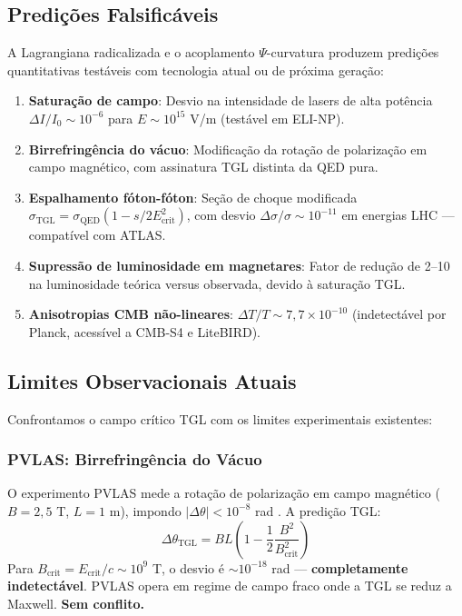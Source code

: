 \documentclass[12pt,a4paper,twoside]{article}
\newcommand{\Psifield}{\Psi}
\newcommand{\Ecrit}{E_{\text{crit}}}
\begin{document}
\subsection{Predi\c{c}\~oes Falsific\'aveis}

A Lagrangiana radicalizada e o acoplamento $\Psifield$-curvatura produzem predi\c{c}\~oes quantitativas test\'aveis com tecnologia atual ou de pr\'oxima gera\c{c}\~ao:

\begin{enumerate}[nosep]
\item \textbf{Satura\c{c}\~ao de campo}: Desvio na intensidade de lasers de alta pot\^encia $\Delta I/I_0 \sim 10^{-6}$ para $E \sim 10^{15}$ V/m (test\'avel em ELI-NP).

\item \textbf{Birrefring\^encia do v\'acuo}: Modifica\c{c}\~ao da rota\c{c}\~ao de polariza\c{c}\~ao em campo magn\'etico, com assinatura TGL distinta da QED pura.

\item \textbf{Espalhamento f\'oton-f\'oton}: Se\c{c}\~ao de choque modificada $\sigma_{\text{TGL}} = \sigma_{\text{QED}}\!\left(1 - s/2\Ecrit^2\right)$, com desvio $\Delta\sigma/\sigma \sim 10^{-11}$ em energias LHC --- compat\'ivel com ATLAS.

\item \textbf{Supress\~ao de luminosidade em magnetares}: Fator de redu\c{c}\~ao de 2--10 na luminosidade te\'orica versus observada, devido \`a satura\c{c}\~ao TGL.

\item \textbf{Anisotropias CMB n\~ao-lineares}: $\Delta T/T \sim 7{,}7 \times 10^{-10}$ (indetect\'avel por Planck, acess\'ivel a CMB-S4 e LiteBIRD).
\end{enumerate}



\subsection{Limites Observacionais Atuais}

Confrontamos o campo cr\'itico TGL com os limites experimentais existentes:

\subsubsection{PVLAS: Birrefring\^encia do V\'acuo}

O experimento PVLAS mede a rota\c{c}\~ao de polariza\c{c}\~ao em campo magn\'etico ($B = 2{,}5$ T, $L = 1$ m), impondo $|\Delta\theta| < 10^{-8}$ rad \cite{PVLAS2015}. A predi\c{c}\~ao TGL:
\begin{equation}
\Delta\theta_{\text{TGL}} = BL\left(1 - \frac{1}{2}\frac{B^2}{B_{\text{crit}}^2}\right)
\label{eq:pvlas_prediction}
\end{equation}
Para $B_{\text{crit}} = \Ecrit/c \sim 10^9$ T, o desvio \'e $\sim 10^{-18}$ rad --- \textbf{completamente indetect\'avel}. PVLAS opera em regime de campo fraco onde a TGL se reduz a Maxwell. \textbf{Sem conflito.}
\end{document}
